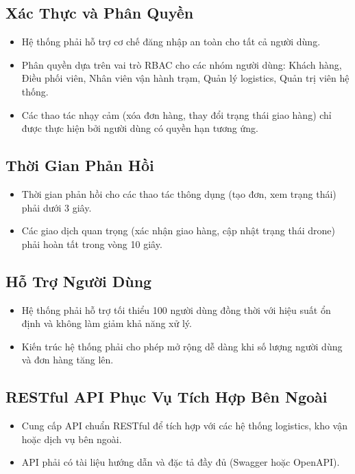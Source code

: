 \subsection{Xác Thực và Phân Quyền}
\begin{itemize}
  \item Hệ thống phải hỗ trợ cơ chế đăng nhập an toàn cho tất cả người dùng.
  \item Phân quyền dựa trên vai trò RBAC cho các nhóm người dùng: Khách hàng, Điều phối viên, Nhân viên vận hành trạm, Quản lý logistics, Quản trị viên hệ thống.
  \item Các thao tác nhạy cảm (xóa đơn hàng, thay đổi trạng thái giao hàng) chỉ được thực hiện bởi người dùng có quyền hạn tương ứng.
\end{itemize}

\subsection{Thời Gian Phản Hồi}
\begin{itemize}
  \item Thời gian phản hồi cho các thao tác thông dụng (tạo đơn, xem trạng thái) phải dưới 3 giây.
  \item Các giao dịch quan trọng (xác nhận giao hàng, cập nhật trạng thái drone) phải hoàn tất trong vòng 10 giây.
\end{itemize}

\subsection{Hỗ Trợ Người Dùng}
\begin{itemize}
  \item Hệ thống phải hỗ trợ tối thiểu 100 người dùng đồng thời với hiệu suất ổn định và không làm giảm khả năng xử lý.
  \item Kiến trúc hệ thống phải cho phép mở rộng dễ dàng khi số lượng người dùng và đơn hàng tăng lên.
\end{itemize}

\subsection{RESTful API Phục Vụ Tích Hợp Bên Ngoài}
\begin{itemize}
  \item Cung cấp API chuẩn RESTful để tích hợp với các hệ thống logistics, kho vận hoặc dịch vụ bên ngoài.
  \item API phải có tài liệu hướng dẫn và đặc tả đầy đủ (Swagger hoặc OpenAPI).
\end{itemize}


